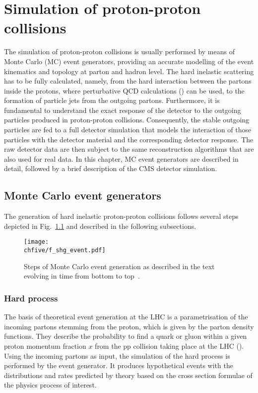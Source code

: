 \chapter{Simulation of proton-proton collisions}
\label{ch:dataAndSim}

The simulation of proton-proton collisions is usually performed by means of Monte Carlo (MC) event generators, providing an accurate modelling of the event kinematics and topology at parton and hadron level.
The hard inelastic scattering has to be fully calculated, namely, from the hard interaction between the partons inside the protons, where perturbative QCD calculations () can be used, to the formation of particle jets from the outgoing partons.
Furthermore, it is fundamental to understand the exact response of the detector to the outgoing particles produced in proton-proton collisions. 
Consequently, the stable outgoing particles are fed to a full detector simulation that models the interaction of those particles with the detector material and the corresponding detector response.
The raw detector data are then subject to the same reconstruction algorithms that are also used for real data.
In this chapter, MC event generators are described in detail, followed by a brief description of the CMS detector simulation.

\section{Monte Carlo event generators}

The generation of hard inelastic proton-proton collisions follows several steps depicted in Fig.~\ref{fig:MCgenSteps} and described in the following subsections.

\begin{figure}[!htb]
\centering
\texttt{[image: \\chfive/f\_shg\_event.pdf]}
\caption{Steps of Monte Carlo event generation as described in the text evolving in time from bottom to top~\cite{Dobbs:2004qw}.}
\label{fig:MCgenSteps}
\end{figure}

\subsection{Hard process}

The basis of theoretical event generation at the LHC is a parametrisation of the incoming partons stemming from the proton, which is given by the parton density functions.
They describe the probability to find a quark or gluon within a given proton momentum fraction $x$ from the pp collision taking place at the LHC ().
Using the incoming partons as input, the simulation of the hard process is performed by the event generator.
It produces hypothetical events with the distributions and rates predicted by theory based on the cross section formulae of the physics process of interest.

